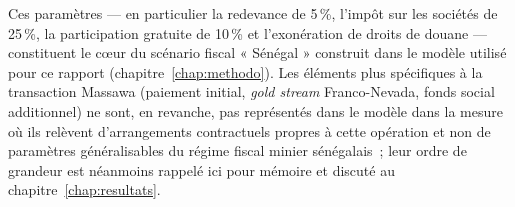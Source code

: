 Ces paramètres --- en particulier la redevance de 5\,\%, l'impôt sur les sociétés de 25\,\%, la participation gratuite de 10\,\% et l'exonération de droits de douane --- constituent le c\oe ur du scénario fiscal « Sénégal » construit dans le modèle utilisé pour ce rapport (chapitre~\ref{chap:methodo}). Les éléments plus spécifiques à la transaction Massawa (paiement initial, \emph{gold stream} Franco-Nevada, fonds social additionnel) ne sont, en revanche, pas représentés dans le modèle dans la mesure où ils relèvent d'arrangements contractuels propres à cette opération et non de paramètres généralisables du régime fiscal minier sénégalais~; leur ordre de grandeur est néanmoins rappelé ici pour mémoire et discuté au chapitre~\ref{chap:resultats}.
